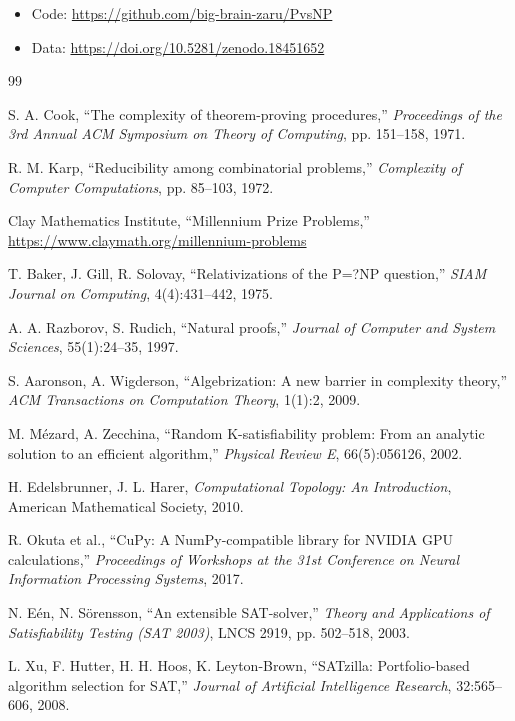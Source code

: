 \documentclass[11pt]{article}
\begin{document}
\begin{itemize}
\item Code: \url{https://github.com/big-brain-zaru/PvsNP}
\item Data: \url{https://doi.org/10.5281/zenodo.18451652}
\end{itemize}


\begin{thebibliography}{99}

S. A. Cook, ``The complexity of theorem-proving procedures,'' \emph{Proceedings of the 3rd Annual ACM Symposium on Theory of Computing}, pp. 151--158, 1971.

R. M. Karp, ``Reducibility among combinatorial problems,'' \emph{Complexity of Computer Computations}, pp. 85--103, 1972.

Clay Mathematics Institute, ``Millennium Prize Problems,'' \url{https://www.claymath.org/millennium-problems}

T. Baker, J. Gill, R. Solovay, ``Relativizations of the P=?NP question,'' \emph{SIAM Journal on Computing}, 4(4):431--442, 1975.

A. A. Razborov, S. Rudich, ``Natural proofs,'' \emph{Journal of Computer and System Sciences}, 55(1):24--35, 1997.

S. Aaronson, A. Wigderson, ``Algebrization: A new barrier in complexity theory,'' \emph{ACM Transactions on Computation Theory}, 1(1):2, 2009.

M. M\'ezard, A. Zecchina, ``Random K-satisfiability problem: From an analytic solution to an efficient algorithm,'' \emph{Physical Review E}, 66(5):056126, 2002.

H. Edelsbrunner, J. L. Harer, \emph{Computational Topology: An Introduction}, American Mathematical Society, 2010.

R. Okuta et al., ``CuPy: A NumPy-compatible library for NVIDIA GPU calculations,'' \emph{Proceedings of Workshops at the 31st Conference on Neural Information Processing Systems}, 2017.

N. E\'en, N. S\"orensson, ``An extensible SAT-solver,'' \emph{Theory and Applications of Satisfiability Testing (SAT 2003)}, LNCS 2919, pp. 502--518, 2003.

L. Xu, F. Hutter, H. H. Hoos, K. Leyton-Brown, ``SATzilla: Portfolio-based algorithm selection for SAT,'' \emph{Journal of Artificial Intelligence Research}, 32:565--606, 2008.

\end{thebibliography}
\end{document}

